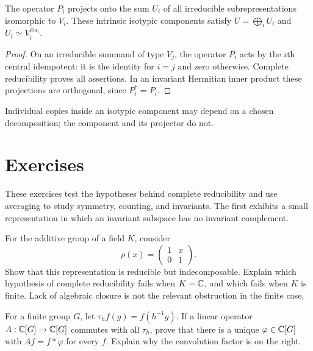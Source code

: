 \begin{prop}
The operator $P_i$ projects onto the sum $U_i$ of all irreducible
subrepresentations isomorphic to $V_i$. These intrinsic isotypic components
satisfy $U=\bigoplus_iU_i$ and $U_i\simeq V_i^{\oplus a_i}$.
\end{prop}
\begin{proof}
On an irreducible summand of type $V_j$, the operator $P_i$ acts by the
$i$th central idempotent: it is the identity for $i=j$ and zero otherwise.
Complete reducibility proves all assertions. In an invariant Hermitian
inner product these projections are orthogonal, since $P_i^*=P_i$.
\end{proof}
Individual copies inside an isotypic component may depend on a chosen
decomposition; the component and its projector do not.

\section{Exercises}
\label{sect1-chap5-exercises}

These exercises test the hypotheses behind complete reducibility and use
averaging to study symmetry, counting, and invariants. The first exhibits a
small representation in which an invariant subspace has no invariant
complement.

\begin{exo}
\label{exo-reductibility-decomposability}
For the additive group of a field $K$, consider
\[
 \rho(x)=\begin{pmatrix}1&x\\0&1\end{pmatrix}.
\]
Show that this representation is reducible but indecomposable. Explain
which hypothesis of complete reducibility fails when $K=\mathbb{C}$, and which
fails when $K$ is finite. Lack of algebraic closure is not the relevant
obstruction in the finite case.
\end{exo}


\begin{exo}
\label{exo-stationary-operators}
For a finite group $G$, let $\tau_hf(g)=f(h^{-1}g)$. If a linear operator
$A:\mathbb{C}[G]\to\mathbb{C}[G]$ commutes with all $\tau_h$, prove that there is a
unique $\varphi\in\mathbb{C}[G]$ with $Af=f*\varphi$ for every $f$.
Explain why the convolution factor is on the right.
\end{exo}

